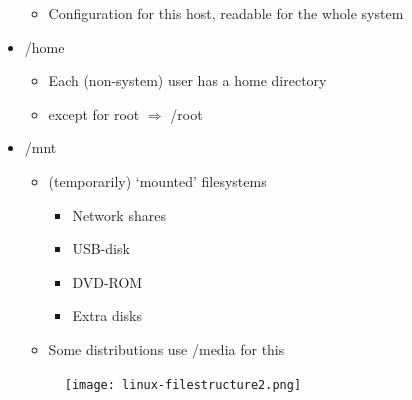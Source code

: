 \documentclass{article}
\begin{document}
\begin{itemize}
\begin{itemize}
        \item Configuration for this host, readable for the whole system
    \end{itemize}
    \item /home
    \begin{itemize}
        \item Each (non-system) user has a home directory
        \item except for root $\Rightarrow$ /root
    \end{itemize}
    \item /mnt
    \begin{itemize}
        \item (temporarily) `mounted' filesystems
        \begin{itemize}
            \item Network shares
            \item USB-disk
            \item DVD-ROM
            \item Extra disks
        \end{itemize}
        \item Some distributions use /media for this
    \end{itemize}
    \begin{figure}[H]
        \centering
        \texttt{[image: linux-filestructure2.png]}
    \end{figure}
    

\end{itemize}
\end{document}
